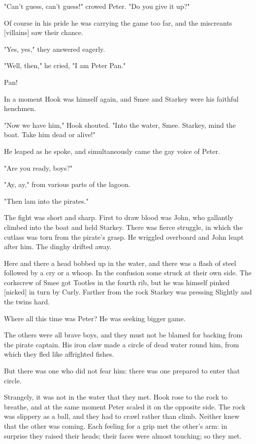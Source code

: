 "Can't guess, can't guess!" crowed Peter. "Do you give it up?"


Of course in his pride he was carrying the game too far, and the
miscreants [villains] saw their chance.


"Yes, yes," they answered eagerly.


"Well, then," he cried, "I am Peter Pan."


Pan!


In a moment Hook was himself again, and Smee and Starkey were his faithful
henchmen.


"Now we have him," Hook shouted. "Into the water, Smee. Starkey, mind the
boat. Take him dead or alive!"


He leaped as he spoke, and simultaneously came the gay voice of Peter.


"Are you ready, boys?"


"Ay, ay," from various parts of the lagoon.


"Then lam into the pirates."


The fight was short and sharp. First to draw blood was John, who gallantly
climbed into the boat and held Starkey. There was fierce struggle, in
which the cutlass was torn from the pirate's grasp. He wriggled overboard
and John leapt after him. The dinghy drifted away.


Here and there a head bobbed up in the water, and there was a flash of
steel followed by a cry or a whoop. In the confusion some struck at their
own side. The corkscrew of Smee got Tootles in the fourth rib, but he was
himself pinked [nicked] in turn by Curly. Farther from the rock Starkey
was pressing Slightly and the twins hard.


Where all this time was Peter? He was seeking bigger game.


The others were all brave boys, and they must not be blamed for backing
from the pirate captain. His iron claw made a circle of dead water round
him, from which they fled like affrighted fishes.


But there was one who did not fear him: there was one prepared to enter
that circle.


Strangely, it was not in the water that they met. Hook rose to the rock to
breathe, and at the same moment Peter scaled it on the opposite side. The
rock was slippery as a ball, and they had to crawl rather than climb.
Neither knew that the other was coming. Each feeling for a grip met the
other's arm: in surprise they raised their heads; their faces were almost
touching; so they met.


